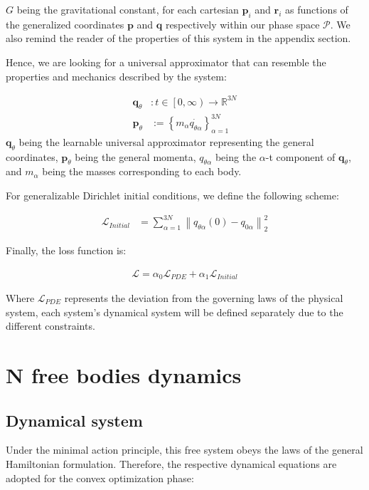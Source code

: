 \documentclass[draft]{agujournal2019}
\newcommand{\norm}[1]{\left\lVert#1\right\rVert}
\begin{document}
$G$ being the gravitational constant, for each cartesian $\mathbf{p}_i$ and $\mathbf{r}_i$ as functions of the generalized coordinates $\mathbf{p}$ and $\mathbf{q}$ respectively within our phase space $\mathcal{P}$. We also remind the reader of the properties of this system in the appendix section.

Hence, we are looking for a universal approximator that can resemble the properties and mechanics described by the system:

\begin{align*}
    \mathbf{q}_\theta &\colon t \in \left[0, \infty\right)\to \mathbb{R}^{3N} \\
    \mathbf{p}_\theta &:= \left\{ m_\alpha \dot{q_{\theta\alpha}} \right\}_{\alpha = 1}^{3N}
\end{align*}
$\mathbf{q}_\theta$ being the learnable universal approximator representing the general coordinates, $\mathbf{p}_\theta$ being the general momenta, $q_{\theta\alpha}$ being the $\alpha$-t component of $\mathbf{q}_\theta$, and $m_{\alpha}$ being the masses corresponding to each body.

For generalizable Dirichlet initial conditions, we define the following scheme:

\begin{align*}
    \mathcal{L}_{Initial} &= \sum_{\alpha = 1}^{3N} \norm{q_{\theta\alpha}(0) - q_{0\alpha}}^2_2
\end{align*}

Finally, the loss function is:

\begin{align*}
    \mathcal{L} = \alpha_0 \mathcal{L}_{PDE} + \alpha_1 \mathcal{L}_{Initial}
\end{align*}

Where $\mathcal{L}_{PDE}$ represents the deviation from the governing laws of the physical system, each system's dynamical system will be defined separately due to the different constraints.

\section{N free bodies dynamics}
\subsection{Dynamical system}
Under the minimal action principle, this free system obeys the laws of the general Hamiltonian formulation. Therefore, the respective dynamical equations are adopted for the convex optimization phase:
\end{document}
